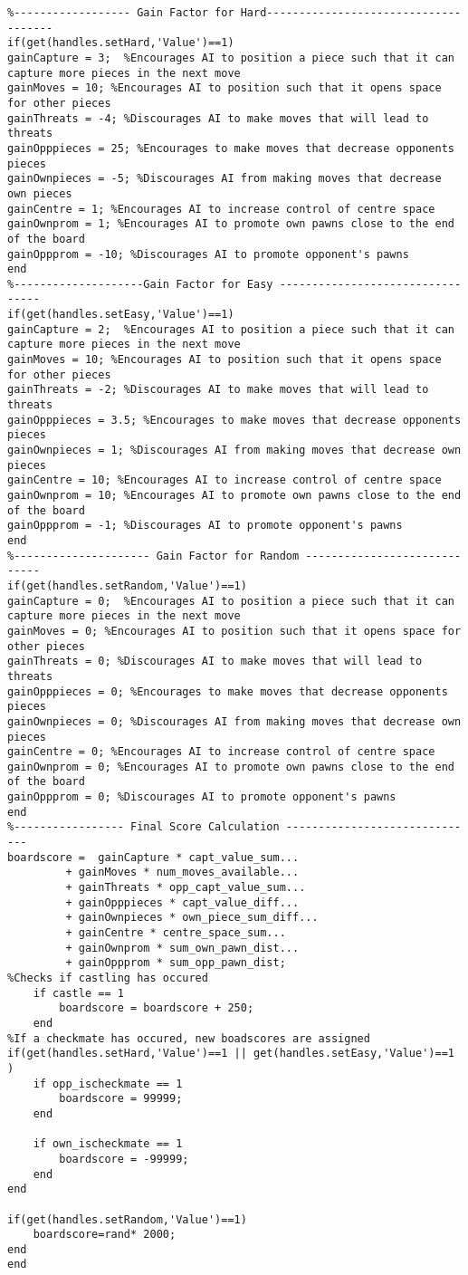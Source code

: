 \documentclass{article}
\begin{document}
\begin{lstlisting}
%------------------ Gain Factor for Hard-------------------------------------
if(get(handles.setHard,'Value')==1)
gainCapture = 3;  %Encourages AI to position a piece such that it can capture more pieces in the next move
gainMoves = 10; %Encourages AI to position such that it opens space for other pieces
gainThreats = -4; %Discourages AI to make moves that will lead to threats
gainOpppieces = 25; %Encourages to make moves that decrease opponents pieces
gainOwnpieces = -5; %Discourages AI from making moves that decrease own pieces
gainCentre = 1; %Encourages AI to increase control of centre space
gainOwnprom = 1; %Encourages AI to promote own pawns close to the end of the board
gainOppprom = -10; %Discourages AI to promote opponent's pawns
end
%--------------------Gain Factor for Easy ---------------------------------
if(get(handles.setEasy,'Value')==1)
gainCapture = 2;  %Encourages AI to position a piece such that it can capture more pieces in the next move
gainMoves = 10; %Encourages AI to position such that it opens space for other pieces
gainThreats = -2; %Discourages AI to make moves that will lead to threats
gainOpppieces = 3.5; %Encourages to make moves that decrease opponents pieces
gainOwnpieces = 1; %Discourages AI from making moves that decrease own pieces
gainCentre = 10; %Encourages AI to increase control of centre space
gainOwnprom = 10; %Encourages AI to promote own pawns close to the end of the board
gainOppprom = -1; %Discourages AI to promote opponent's pawns
end
%--------------------- Gain Factor for Random -----------------------------
if(get(handles.setRandom,'Value')==1)
gainCapture = 0;  %Encourages AI to position a piece such that it can capture more pieces in the next move
gainMoves = 0; %Encourages AI to position such that it opens space for other pieces
gainThreats = 0; %Discourages AI to make moves that will lead to threats
gainOpppieces = 0; %Encourages to make moves that decrease opponents pieces
gainOwnpieces = 0; %Discourages AI from making moves that decrease own pieces
gainCentre = 0; %Encourages AI to increase control of centre space
gainOwnprom = 0; %Encourages AI to promote own pawns close to the end of the board
gainOppprom = 0; %Discourages AI to promote opponent's pawns
end
%----------------- Final Score Calculation ------------------------------
boardscore =  gainCapture * capt_value_sum... 
         + gainMoves * num_moves_available... 
         + gainThreats * opp_capt_value_sum...
         + gainOpppieces * capt_value_diff...
         + gainOwnpieces * own_piece_sum_diff...
         + gainCentre * centre_space_sum...
         + gainOwnprom * sum_own_pawn_dist...
         + gainOppprom * sum_opp_pawn_dist;
%Checks if castling has occured
    if castle == 1
        boardscore = boardscore + 250;
    end
%If a checkmate has occured, new boadscores are assigned
if(get(handles.setHard,'Value')==1 || get(handles.setEasy,'Value')==1 )
    if opp_ischeckmate == 1
        boardscore = 99999;
    end

    if own_ischeckmate == 1
        boardscore = -99999;
    end
end

if(get(handles.setRandom,'Value')==1)
    boardscore=rand* 2000;
end
end
\end{lstlisting}
\end{document}
